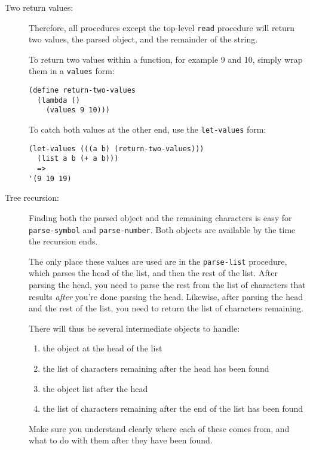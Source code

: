 \documentclass[12pt]{article}
\begin{document}
\begin{description}
\item[Two return values:]

Therefore, all procedures except the top-level \lstinline{read}
procedure will return two values, the parsed object, and the
remainder of the string.

To return two values within a function, for example 9 and 10,
simply wrap them in a \lstinline{values} form:
\begin{lstlisting}
(define return-two-values
  (lambda ()
    (values 9 10)))
\end{lstlisting}
To catch both values at the other end, use the \lstinline{let-values}
form:
\begin{lstlisting}
(let-values (((a b) (return-two-values)))
  (list a b (+ a b)))
  =>
'(9 10 19)
\end{lstlisting}

\item[Tree recursion:]
Finding both the parsed object and the remaining
characters is easy for \lstinline{parse-symbol}
and \lstinline{parse-number}.  Both objects
are available by the time the recursion ends.

The only place these values are used are in the 
\lstinline{parse-list} procedure, which
parses the head of the list, and then
the rest of the list.  After parsing
the head, you need to parse the rest from the
list of characters that results {\em after}
you're done parsing the head.  Likewise,
after parsing the head and the rest of the list,
you need to return the list of characters remaining.

There will thus be several intermediate objects
to handle:
\begin{enumerate}
\item the object at the head of the list
\item the list of characters remaining after the head has been found
\item the object list after the head
\item the list of characters remaining after the end of the list
has been found
\end{enumerate}
Make sure you understand clearly where each of these 
comes from, and what to do with them after they have been found.



\end{description}
\end{document}
